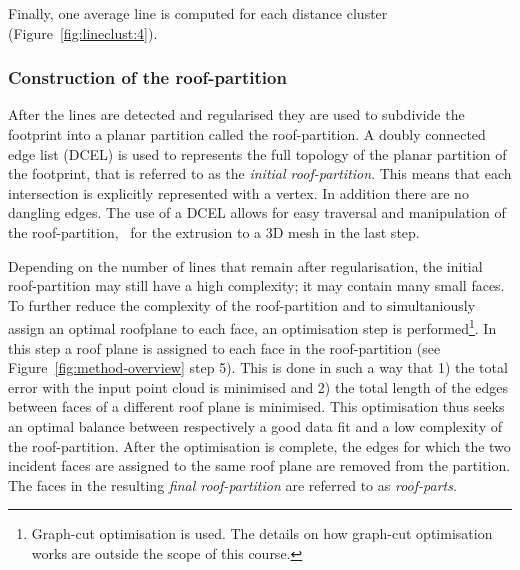 Finally, one average line is computed for each distance cluster (Figure~\ref{fig:lineclust:4}).

\subsubsection{Construction of the roof-partition}
After the lines are detected and regularised they are used to subdivide the footprint into a planar partition called the roof-partition.
A doubly connected edge list (DCEL) is used to represents the full topology of the planar partition of the footprint, that is referred to as the \emph{initial roof-partition}.
This means that each intersection is explicitly represented with a vertex.
In addition there are no dangling edges.
The use of a DCEL allows for easy traversal and manipulation of the roof-partition, \eg\ for the extrusion to a 3D mesh in the last step.


Depending on the number of lines that remain after regularisation, the initial roof-partition may still have a high complexity; it may contain many small faces.
To further reduce the complexity of the roof-partition and to simultaniously assign an optimal roofplane to each face, an optimisation step is performed\footnote{Graph-cut optimisation is used. The details on how graph-cut optimisation works are outside the scope of this course.}.
In this step a roof plane is assigned to each face in the roof-partition (see Figure~\ref{fig:method-overview} step 5).
This is done in such a way that 1) the total error with the input point cloud is minimised and 2) the total length of the edges between faces of a different roof plane is minimised.
This  optimisation thus seeks an optimal balance between respectively a good data fit and a low complexity of the roof-partition.
After the optimisation is complete, the edges for which the two incident faces are assigned to the same roof plane are removed from the partition.
The faces in the resulting \emph{final roof-partition} are referred to as \emph{roof-parts}.

